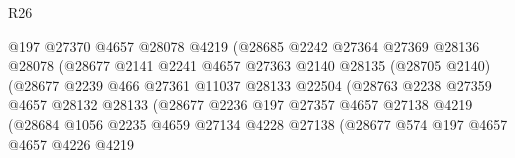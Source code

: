 \begin{lexlean}{R26}
\begin{coremodule}
                                    @197
                                    @27370
                                    @4657
                                    @28078
                                    @4219
                                    (@28685
                                      @2242
                                      @27364
                                      @27369
                                      @28136
                                      @28078
                                      (@28677
                                        @2141
                                        @2241
                                        @4657
                                        @27363
                                        @2140
                                        @28135
                                        (@28705 @2140)
                                        (@28677
                                          @2239
                                          @466
                                          @27361
                                          @11037
                                          @28133
                                          @22504
                                          (@28763
                                            @2238
                                            @27359
                                            @4657
                                            @28132
                                            @28133
                                            (@28677
                                              @2236
                                              @197
                                              @27357
                                              @4657
                                              @27138
                                              @4219
                                              (@28684
                                                @1056
                                                @2235
                                                @4659
                                                @27134
                                                @4228
                                                @27138
                                                (@28677
                                                  @574
                                                  @197
                                                  @4657
                                                  @4657
                                                  @4226
                                                  @4219

\end{coremodule}
\end{lexlean}
